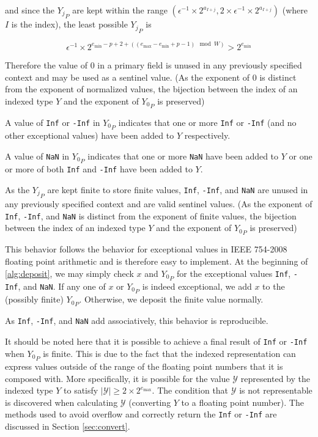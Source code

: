 \documentclass[12pt]{article}
\providecommand{\min}{\ensuremath{\text{min}}}
\providecommand{\max}{\ensuremath{\text{max}}}
\theoremstyle{plain}
\numberwithin{equation}{section}
\begin{document}
      and since the ${Y_j}_P$ are kept within the range $(\epsilon^{-1} \times 2^{a_{I + j}}, 2 \times \epsilon^{-1} \times 2^{a_{I + j}})$ (where $I$ is the index), the least possible ${Y_j}_P$ is

      \begin{equation*}
      \epsilon^{-1} \times 2^{e_{\min} - p + 2 + ((e_{\max} - e_{\min} + p - 1)\mod W)} > 2^{e_{\min}}
      \end{equation*}

      Therefore the value of $0$ in a primary field is unused in any previously specified context and may be used as a sentinel value. (As the exponent of $0$ is distinct from the exponent of normalized values, the bijection between the index of an indexed type $Y$ and the exponent of ${Y_0}_P$ is preserved)

      A value of \verb|Inf| or \verb|-Inf| in ${Y_0}_P$ indicates that one or more \verb|Inf| or \verb|-Inf| (and no other exceptional values) have been added to $Y$ respectively.

      A value of \verb|NaN| in ${Y_0}_P$ indicates that one or more \verb|NaN| have been added to $Y$ or one or more of both \verb|Inf| and \verb|-Inf| have been added to $Y$.

      As the ${Y_j}_P$ are kept finite to store finite values, \verb|Inf|, \verb|-Inf|, and \verb|NaN| are unused in any previously specified context and are valid sentinel values. (As the exponent of \verb|Inf|, \verb|-Inf|, and \verb|NaN| is distinct from the exponent of finite values, the bijection between the index of an indexed type $Y$ and the exponent of ${Y_0}_P$ is preserved)

      This behavior follows the behavior for exceptional values in IEEE 754-2008 floating point arithmetic and is therefore easy to implement. At the beginning of \ref{alg:deposit}, we may simply check $x$ and ${Y_0}_P$ for the exceptional values \verb|Inf|, \verb|-Inf|, and \verb|NaN|. If any one of $x$ or ${Y_0}_P$ is indeed exceptional, we add $x$ to the (possibly finite) ${Y_0}_P$. Otherwise, we deposit the finite value normally.

      As \verb|Inf|, \verb|-Inf|, and \verb|NaN| add associatively, this behavior is reproducible.

      It should be noted here that it is possible to achieve a final result of \verb|Inf| or \verb|-Inf| when ${Y_0}_P$ is finite. This is due to the fact that the indexed representation can express values outside of the range of the floating point numbers that it is composed with. More specifically, it is possible for the value $\mathcal{Y}$ represented by the indexed type $Y$ to satisfy $|\mathcal{Y}| \geq 2 \times 2^{e_{\max}}$. The condition that $\mathcal{Y}$ is not representable is discovered when calculating $\mathcal{Y}$ (converting $Y$ to a floating point number). The methods used to avoid overflow and correctly return the \verb|Inf| or \verb|-Inf| are discussed in Section \ref{sec:convert}.
\end{document}
